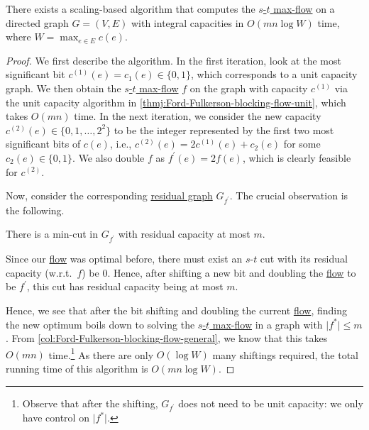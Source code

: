 \begin{theorem}\label{thm:Ford-Fulkerson-scaling}
	There exists a scaling-based algorithm that computes the \hyperref[prb:s-t-max-flow]{\(s\)-\(t\) max-flow} on a directed graph \(G = (V, E)\) with integral capacities in \(O(mn \log W)\) time, where \(W = \max _{e \in E} c(e)\).
\end{theorem}
\begin{proof}
	We first describe the algorithm. In the first iteration, look at the most significant bit \(c^{(1)}(e) = c_1(e) \in \{ 0, 1 \} \), which corresponds to a unit capacity graph. We then obtain the \hyperref[prb:s-t-max-flow]{\(s\)-\(t\) max-flow} \(f\) on the graph with capacity \(c^{(1)}\) via the unit capacity algorithm in \autoref{thmj:Ford-Fulkerson-blocking-flow-unit}, which takes \(O(mn)\) time. In the next iteration, we consider the new capacity \(c^{(2)}(e) \in \{ 0, 1, \dots , 2^2 \} \) to be the integer represented by the first two most significant bits of \(c(e)\), i.e., \(c^{(2)} (e) = 2 c^{(1)}(e) + c_2(e)\) for some \(c_2(e) \in \{ 0, 1 \} \). We also double \(f\) as \(f^{\prime} (e) = 2 f(e)\), which is clearly feasible for \(c^{(2)}\).

	Now, consider the corresponding \hyperref[def:residual-graph]{residual graph} \(G_{f^{\prime} }\). The crucial observation is the following.

	\begin{claim}
		There is a min-cut in \(G_{f^{\prime} }\) with residual capacity at most \(m\).
	\end{claim}
	\begin{explanation}
		Since our \hyperref[def:flow]{flow} was optimal before, there must exist an \(s\)-\(t\) cut with its residual capacity (w.r.t.\ \(f\)) be \(0\). Hence, after shifting a new bit and doubling the \hyperref[def:flow]{flow} to be \(f^{\prime} \), this cut has residual capacity being at most \(m\).
	\end{explanation}

	Hence, we see that after the bit shifting and doubling the current \hyperref[def:flow]{flow}, finding the new optimum boils down to solving the \hyperref[prb:s-t-max-flow]{\(s\)-\(t\) max-flow} in a graph with \(\lvert f^{\ast} \rvert \leq m\). From \autoref{col:Ford-Fulkerson-blocking-flow-general}, we know that this takes \(O(mn)\) time.\footnote{Observe that after the shifting, \(G_{f^{\prime} }\) does not need to be unit capacity: we only have control on \(\lvert f^{\ast} \rvert \).} As there are only \(O(\log W)\) many shiftings required, the total running time of this algorithm is \(O(mn \log W)\).
\end{proof}

